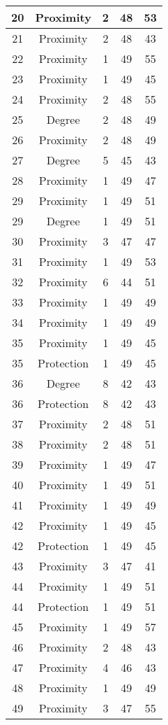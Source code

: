 \documentclass[results.tex]{subfiles}
\begin{document}
\begin{center}
\begin{tabular}{| c || c | c | c | c |}
    \hline
    20 & Proximity & 2 & 48 & 53 \\ 
    \hline
    21 & Proximity & 2 & 48 & 43 \\ 
    \hline
    22 & Proximity & 1 & 49 & 55 \\ 
    \hline
    23 & Proximity & 1 & 49 & 45 \\ 
    \hline
    24 & Proximity & 2 & 48 & 55 \\ 
    \hline
    25 & Degree & 2 & 48 & 49 \\ 
    \hline
    26 & Proximity & 2 & 48 & 49 \\ 
    \hline
    27 & Degree & 5 & 45 & 43 \\ 
    \hline
    28 & Proximity & 1 & 49 & 47 \\ 
    \hline
    29 & Proximity & 1 & 49 & 51 \\ 
    \hline
    29 & Degree & 1 & 49 & 51 \\ 
    \hline
    30 & Proximity & 3 & 47 & 47 \\ 
    \hline
    31 & Proximity & 1 & 49 & 53 \\ 
    \hline
    32 & Proximity & 6 & 44 & 51 \\ 
    \hline
    33 & Proximity & 1 & 49 & 49 \\ 
    \hline
    34 & Proximity & 1 & 49 & 49 \\ 
    \hline
    35 & Proximity & 1 & 49 & 45 \\ 
    \hline
    35 & Protection & 1 & 49 & 45 \\ 
    \hline
    36 & Degree & 8 & 42 & 43 \\ 
    \hline
    36 & Protection & 8 & 42 & 43 \\ 
    \hline
    37 & Proximity & 2 & 48 & 51 \\ 
    \hline
    38 & Proximity & 2 & 48 & 51 \\ 
    \hline
    39 & Proximity & 1 & 49 & 47 \\ 
    \hline
    40 & Proximity & 1 & 49 & 51 \\ 
    \hline
    41 & Proximity & 1 & 49 & 49 \\ 
    \hline
    42 & Proximity & 1 & 49 & 45 \\ 
    \hline
    42 & Protection & 1 & 49 & 45 \\ 
    \hline
    43 & Proximity & 3 & 47 & 41 \\ 
    \hline
    44 & Proximity & 1 & 49 & 51 \\ 
    \hline
    44 & Protection & 1 & 49 & 51 \\ 
    \hline
    45 & Proximity & 1 & 49 & 57 \\ 
    \hline
    46 & Proximity & 2 & 48 & 43 \\ 
    \hline
    47 & Proximity & 4 & 46 & 43 \\ 
    \hline
    48 & Proximity & 1 & 49 & 49 \\ 
    \hline
    49 & Proximity & 3 & 47 & 55 \\ 
    \hline   \end{tabular}
\end{center}
\end{document}
